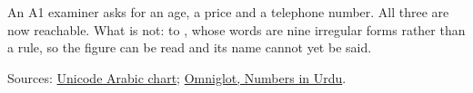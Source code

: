 An A1 examiner asks for an age, a price and a telephone number. All three are now reachable. What is not: \textbf{} to \textbf{}, whose words are nine irregular forms rather than a rule, so the figure can be read and its name cannot yet be said.

\begin{tcolorbox}[breakable,colback=teal!4,colframe=teal!35!black,title={Before you move on}]
Sources: \href{https://www.unicode.org/charts/PDF/U0600.pdf}{Unicode Arabic chart}; \href{https://www.omniglot.com/language/numbers/urdu.htm}{Omniglot, Numbers in Urdu}.
\end{tcolorbox}

